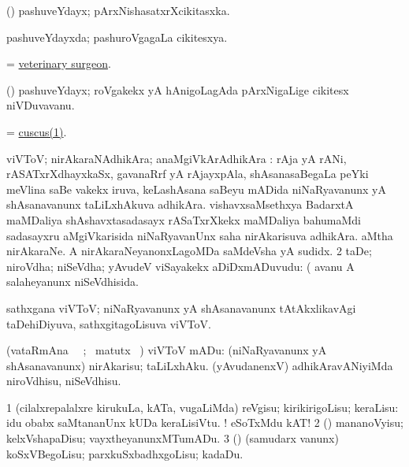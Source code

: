 \bentry
{} 
\gl{\nA}
\expl{}
\bmng
 (\ame) pashuveYdayx; pArxNishasatxrXcikitasxka. 
\emng
\eentry

\bentry
{} 
\gl{\gu}
\expl{}
\bmng
 pashuveYdayxda; pashuroVgagaLa cikitesxya. 
\emng
\eentry

\bentry
{} 
\gl{\nA}
\bmng
 = \hyperlink{veterinary surgeon}{veterinary surgeon}. 
\emng
\eentry

\bentry
{}
\gl{\nA}
\expl{}
\bmng
 (\birx) pashuveYdayx; roVgakekx yA hAnigoLagAda pArxNigaLige cikitesx niVDuvavanu. 
\emng
\eentry

\bentry
{} 
\gl{\nA}
\bmng
 = \hyperref{kandict_c.pdf}{C}{cuscus(1)}{cuscus(1)}. 
\emng
\eentry

\bentry
{} 
\gl{\nA}
\bmng
\bnum
{} viVToV; nirAkaraNAdhikAra; anaMgiVkArAdhikAra : 
\banum
{} rAja yA rANi, rASATxrXdhayxkaSx, gavanaRrf yA rAjayxpAla, shAsanasaBegaLa peYki meVlina saBe \mo vakekx iruva, keLashAsana saBeyu mADida niNaRyavanunx yA shAsanavanunx taLiLxhAkuva adhikAra. 
 vishavxsaMsethxya BadarxtA maMDaliya shAshavxtasadasayx rASaTxrXkekx maMDaliya bahumaMdi sadasayxru aMgiVkarisida niNaRyavanUnx saha nirAkarisuva adhikAra. 
 aMtha nirAkaraNe. 
 A nirAkaraNeyanonxLagoMDa saMdeVsha yA sudidx. 
\eanum
\numie
\num{2} taDe; niroVdha; niSeVdha; yAvudeV viSayakekx aDiDxmADuvudu:  (  avanu A salaheyanunx niSeVdhisida. 
\enum
\emng

\noindent 
\gl{\pagu}
\expl{}
\bmng
  sathxgana viVToV; niNaRyavanunx yA shAsanavanunx tAtAkxlikavAgi taDehiDiyuva, sathxgitagoLisuva viVToV. 
\emng
\eentry

\bentry
{} 
\gl{\sakirx}(vataRmAna \parxpu\ \Eva\ ; \BU\ matutx
\BUkaq\ ) \bmng
 viVToV mADu: 
\banum
{} (niNaRyavanunx yA shAsanavanunx) nirAkarisu; taLiLxhAku. 
 (yAvudanenxV) adhikAravANiyiMda niroVdhisu, niSeVdhisu. 
\eanum
\emng
\eentry

\bentry
{} 
\gl{\sakirx}
\expl{}
\bmng
\bnum
\num{1} (cilalxrepalalxre kirukuLa, kATa, \mo vugaLiMda) reVgisu; kirikirigoLisu; keraLisu:  idu obabx saMtananUnx kUDa keraLisiVtu. ! eSoTxMdu kAT! 
\num{2} (\pArxparx) mananoVyisu; kelxVshapaDisu; vayxtheyanunxMTumADu. 
\num{3} (\pArxparx) (samudarx \mo vanunx) koSxVBegoLisu; parxkuSxbadhxgoLisu; kadaDu. 
\enum
\emng
\eentry

